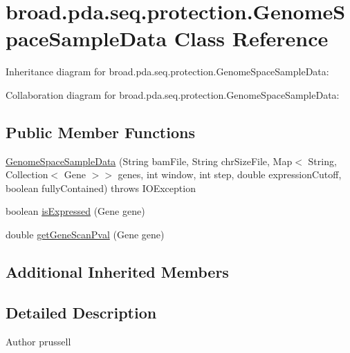 \hypertarget{classbroad_1_1pda_1_1seq_1_1protection_1_1_genome_space_sample_data}{\section{broad.\+pda.\+seq.\+protection.\+Genome\+Space\+Sample\+Data Class Reference}
\label{classbroad_1_1pda_1_1seq_1_1protection_1_1_genome_space_sample_data}
}


Inheritance diagram for broad.\+pda.\+seq.\+protection.\+Genome\+Space\+Sample\+Data\+:


Collaboration diagram for broad.\+pda.\+seq.\+protection.\+Genome\+Space\+Sample\+Data\+:
\subsection*{Public Member Functions}
\begin{DoxyCompactItemize}
\item 
\hyperlink{classbroad_1_1pda_1_1seq_1_1protection_1_1_genome_space_sample_data_ab048b235d662fc6a9ebee44e59259542}{Genome\+Space\+Sample\+Data} (String bam\+File, String chr\+Size\+File, Map$<$ String, Collection$<$ Gene $>$$>$ genes, int window, int step, double expression\+Cutoff, boolean fully\+Contained)  throws I\+O\+Exception 
\item 
boolean \hyperlink{classbroad_1_1pda_1_1seq_1_1protection_1_1_genome_space_sample_data_abf6af4a1de83e2cfd80b682ef1f4dbe9}{is\+Expressed} (Gene gene)
\item 
double \hyperlink{classbroad_1_1pda_1_1seq_1_1protection_1_1_genome_space_sample_data_ad2292944e532fa900f27933bc2cfc7a2}{get\+Gene\+Scan\+Pval} (Gene gene)
\end{DoxyCompactItemize}
\subsection*{Additional Inherited Members}


\subsection{Detailed Description}
\begin{DoxyAuthor}{Author}
prussell 
\end{DoxyAuthor}


